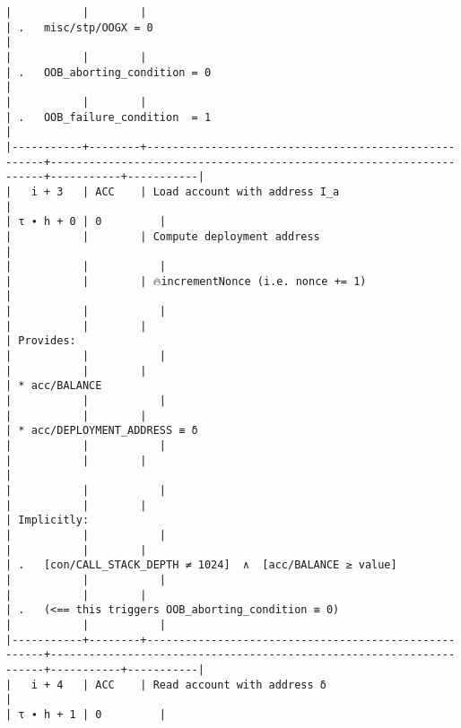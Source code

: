 \documentclass[varwidth=\maxdimen,margin=0.5cm,multi={verbatim}]{standalone}
\begin{document}
\begin{verbatim}
|           |        |                                                      | .   misc/stp/OOGX = 0                                               |
|           |        |                                                      | .   OOB_aborting_condition = 0                                      |
|           |        |                                                      | .   OOB_failure_condition  = 1                                      |
|-----------+--------+------------------------------------------------------+---------------------------------------------------------------------+-----------+-----------|
|   i + 3   | ACC    | Load account with address I_a                        |                                                                     | τ ∙ h + 0 | 0         |
|           |        | Compute deployment address                           |                                                                     |           |           |
|           |        | 🔥incrementNonce (i.e. nonce += 1)                   |                                                                     |           |           |
|           |        |                                                      | Provides:                                                           |           |           |
|           |        |                                                      | * acc/BALANCE                                                       |           |           |
|           |        |                                                      | * acc/DEPLOYMENT_ADDRESS ≡ δ                                        |           |           |
|           |        |                                                      |                                                                     |           |           |
|           |        |                                                      | Implicitly:                                                         |           |           |
|           |        |                                                      | .   [con/CALL_STACK_DEPTH ≠ 1024]  ∧  [acc/BALANCE ≥ value]         |           |           |
|           |        |                                                      | .   (<== this triggers OOB_aborting_condition ≡ 0)                  |           |           |
|-----------+--------+------------------------------------------------------+---------------------------------------------------------------------+-----------+-----------|
|   i + 4   | ACC    | Read account with address δ                          |                                                                     | τ ∙ h + 1 | 0         |

\end{verbatim}
\end{document}
